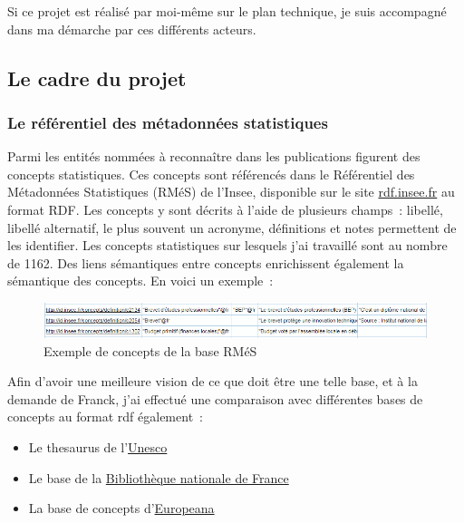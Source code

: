 Si ce projet est réalisé par moi-même sur le plan technique, je suis accompagné dans ma démarche par ces différents acteurs.
\label{section 1.1.2}

\subsection{Le cadre du projet}

\subsubsection{Le référentiel des métadonnées statistiques}
Parmi les entités nommées à reconnaître dans les publications figurent des concepts statistiques. Ces concepts sont référencés dans le Référentiel des Métadonnées Statistiques (RMéS) de l'Insee, disponible sur le site \href{http://rdf.insee.fr/sparql}{rdf.insee.fr} \cite{rdf.insee.fr} au format RDF. Les concepts y sont décrits à l'aide de plusieurs champs~: libellé, libellé alternatif, le plus souvent un acronyme, définitions et notes permettent de les identifier. Les concepts statistiques sur lesquels j'ai travaillé sont au nombre de 1162. Des liens sémantiques entre concepts enrichissent également la sémantique des concepts. En voici un exemple~:
\begin{figure}[H]
    \centering
    \includegraphics[scale=0.68]{images/Exemple-RMeS.png}
    \caption{Exemple de concepts de la base RMéS}
    \label{fig:exemple-rmés}
\end{figure}

Afin d'avoir une meilleure vision de ce que doit être une telle base, et à la demande de Franck, j'ai effectué une comparaison avec différentes bases de concepts au format rdf également~: 
\begin{itemize}
    \item Le thesaurus de l'\href{http://vocabularies.unesco.org/browser/thesaurus/en/?clang=fr}{Unesco} \cite{unesco}
    \item Le base de la \href{https://data.bnf.fr/current/sparql.html}{Bibliothèque nationale de France} \cite{bnf}
    \item La base de concepts d'\href{https://pro.europeana.eu/page/linked-open-data}{Europeana} \cite{europeana-rdf}
    \newline
\end{itemize}

